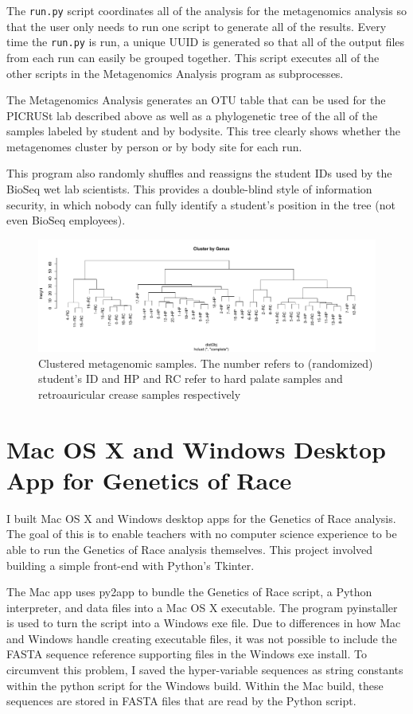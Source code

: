 \documentclass{report}
\begin{document}
The \texttt{run.py} script coordinates all of the analysis for the metagenomics analysis so that the user only needs to run one script to generate all of the results. Every time the \texttt{run.py} is run, a unique UUID is generated so that all of the output files from each run can easily be grouped together. This script executes all of the other scripts in the Metagenomics Analysis program as subprocesses.

The Metagenomics Analysis generates an OTU table that can be used for the PICRUSt lab described above as well as a phylogenetic tree of the all of the samples labeled by student and by bodysite. This tree clearly shows whether the metagenomes cluster by person or by body site for each run. 

This program also randomly shuffles and reassigns the student IDs used by the BioSeq wet lab scientists. This provides a double-blind style of information security, in which nobody can fully identify a student's position in the tree (not even BioSeq employees). 

\begin{figure}[h]
\includegraphics[width=\linewidth]{tree.pdf}
\caption{Clustered metagenomic samples. The number refers to (randomized) student's ID and HP and RC refer to hard palate samples and retroauricular crease samples respectively}
\end{figure}

\section{Mac OS X and Windows Desktop App for Genetics of Race}

I built Mac OS X and Windows desktop apps for the Genetics of Race analysis. The goal of this is to enable teachers with no computer science experience to be able to run the Genetics of Race analysis themselves. This project involved building a simple front-end with Python's Tkinter. 

The Mac app uses py2app to bundle the Genetics of Race script, a Python interpreter, and data files into a Mac OS X executable. The program pyinstaller is used to turn the script into a Windows exe file. Due to differences in how Mac and Windows handle creating executable files, it was not possible to include the FASTA sequence reference supporting files in the Windows exe install. To circumvent this problem, I saved the hyper-variable sequences as string constants within the python script for the Windows build. Within the Mac build, these sequences are stored in FASTA files that are read by the Python script. 
\end{document}
